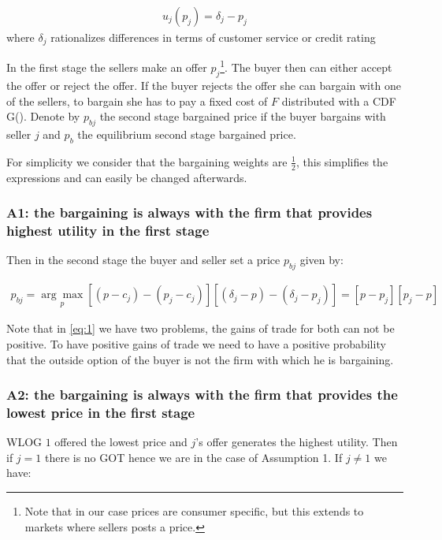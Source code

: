 \documentclass[12pt]{article}
\theoremstyle{plain}
\theoremstyle{plain}
\begin{document}
\begin{align*}
   u_j(p_j) =  \delta_j - p_j
\end{align*}
where $\delta_j$ rationalizes differences in terms of customer service or credit rating %

In the first stage the sellers make an offer $p_j$\footnote{Note that in our case prices are consumer specific, but this extends to markets where sellers posts a price.}. The buyer then can either accept the offer or reject the offer.   If the buyer rejects the offer she can bargain with one of the sellers, to bargain she has to pay a fixed cost of $F$ distributed with a CDF G(). Denote by $p_{bj}$ the second stage bargained price if the buyer bargains with seller $j$ and $p_b$ the equilibrium second stage bargained price. 

For simplicity we consider that the bargaining weights are $\frac{1}{2}$, this simplifies the expressions and can easily be changed afterwards. 


\subsubsection*{A1: the bargaining is always with the firm that provides highest utility in the first stage}

Then in the second stage the buyer and seller set a price $p_{bj}$ given by: 

\begin{align}\label{eq:1}
p_{bj}= \underset{p}{\arg \max} [(p-c_j) - (p_j - c_j) ]  [(\delta_j - p) - (\delta_j - p_j)]  = [p - p_j]  [p_j - p]  
\end{align}

Note that in \ref{eq:1} we have two problems, the gains of trade for both can not be positive. To have positive gains of trade we need to have a positive probability that the outside option of the buyer is not the firm with which he is bargaining. 



\subsubsection*{A2: the bargaining is always with the firm that provides the lowest price in the first stage}

WLOG $1$ offered the lowest price and $j$'s offer generates the highest utility. Then if $j =1$ there is no GOT hence we are in the case of Assumption 1. If $j \neq 1$ we have: 
\end{document}
